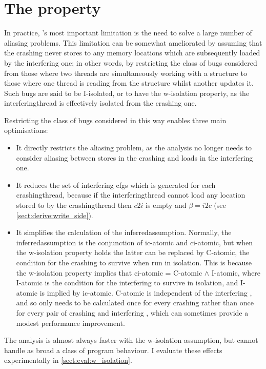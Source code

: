 \section{The  property}
\label{sect:derive:w_isolation}

In practice, {\technique}'s most important limitation is the need to
solve a large number of aliasing problems.  This limitation can be
somewhat ameliorated by assuming that the crashing {\StateMachine}
never stores to any memory locations which are subsequently loaded by
the interfering one; in other words, by restricting the class of bugs
considered from those where two threads are simultaneously working
with a structure to those where one thread is reading from the
structure whilst another updates it.  Such bugs are said to be
I-isolated, or to have the \gls{w-isolation} property, as the
\gls{interferingthread} is effectively isolated from the crashing one.

Restricting the class of bugs considered in this way enables three
main optimisations:
\begin{itemize}
\item
  It directly restricts the aliasing problem, as the analysis no
  longer needs to consider aliasing between stores in the crashing
  {\StateMachine} and loads in the interfering one.
\item
  It reduces the set of interfering \glspl{cfg} which is generated for
  each \gls{crashingthread}, because if the \gls{interferingthread}
  cannot load any location stored to by the \gls{crashingthread} then
  $c2i$ is empty and $\beta = i2c$ (see
  \autoref{sect:derive:write_side}).
\item
  It simplifies the calculation of the \gls{inferredassumption}.
  Normally, the \gls{inferredassumption} is the conjunction of
  \gls{ic-atomic} and \gls{ci-atomic}, but when the \gls{w-isolation}
  property holds the latter can be replaced by C-atomic, the condition
  for the crashing {\StateMachine} to survive when run in isolation.
  This is because the \gls{w-isolation} property implies that
  \gls{ci-atomic} = C-atomic $\wedge$ I-atomic, where I-atomic is the
  condition for the interfering {\StateMachine} to survive in
  isolation, and I-atomic is implied by \gls{ic-atomic}.  C-atomic is
  independent of the interfering {\StateMachine}, and so only needs to
  be calculated once for every crashing {\StateMachine} rather than
  once for every pair of crashing and interfering {\StateMachines},
  which can sometimes provide a modest performance improvement.
\end{itemize}
The analysis is almost always faster with the \gls{w-isolation}
assumption, but cannot handle as broad a class of program behaviour.
I evaluate these effects experimentally in
\autoref{sect:eval:w_isolation}.

